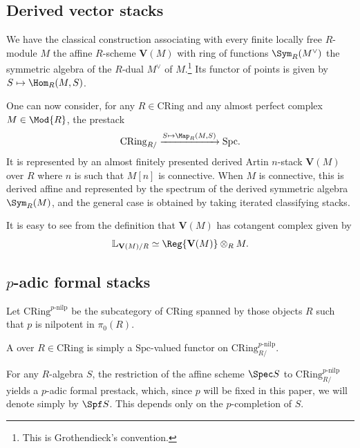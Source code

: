 \documentclass[10pt]{amsart}
\begin{document}
\subsection{Derived vector stacks}
\label{subsec:vector stacks}

We have the classical construction associating with every finite locally free $R$-module $M$ the affine $R$-scheme $\mathbf{V}(M)$ with ring of functions $\Sym_R(M^\vee)$ the symmetric algebra of the $R$-dual $M^\vee$ of $M$.\footnote{This is Grothendieck's convention.} Its functor of points is given by $S\mapsto \Hom_R(M,S)$.

One can now consider, for any $R\in \mathrm{CRing}$ and any almost perfect complex $M\in \Mod{R}$, the prestack
\[
\mathrm{CRing}_{R/}\xrightarrow{S\mapsto \Map_{{R}}(M,S)}\mathrm{Spc}.
\]
It is represented by an almost finitely presented derived Artin $n$-stack $\mathbf{V}(M)$ over $R$ where $n$ is such that $M[n]$ is connective. When $M$ is connective, this is derived affine and represented by the spectrum of the derived symmetric algebra $\Sym_R(M)$, and the general case is obtained by taking iterated classifying stacks.

It is easy to see from the definition that $\mathbf{V}(M)$ has cotangent complex given by
\[
\mathbb{L}_{\mathbf{V}(M)/R}\simeq \Reg{\mathbf{V}(M)}\otimes_RM.
\]

\subsection{$p$-adic formal stacks}
\label{subsec:padic_formal_stacks}

Let $\mathrm{CRing}^{p\text{-nilp}}$ be the subcategory of $\mathrm{CRing}$ spanned by those objects $R$ such that $p$ is nilpotent in $\pi_0(R)$. 

\begin{definition}
A  over $R\in \mathrm{CRing}$ is simply a $\mathrm{Spc}$-valued functor on $\mathrm{CRing}^{p\text{-nilp}}_{R/}$. 
\end{definition}

\begin{definition}
For any $R$-algebra $S$, the restriction of the affine scheme $\Spec S$ to $\mathrm{CRing}^{p\text{-nilp}}_{R/}$ yields a $p$-adic formal prestack, which, since $p$ will be fixed in this paper, we will denote simply by $\Spf S$. This depends only on the $p$-completion of $S$.
\end{definition}
\end{document}
